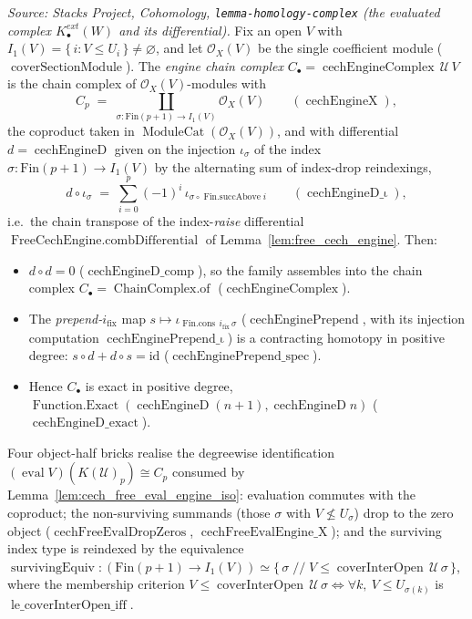 \begin{lemma}
  \textit{Source: Stacks Project, Cohomology, \texttt{lemma-homology-complex}
  (the evaluated complex \(K^{ext}_\bullet(W)\) and its differential).}
  Fix an open \(V\) with \(I_1(V) = \{\, i : V \leq U_i \,\} \neq \varnothing\), and
  let \(\mathcal{O}_X(V)\) be the single coefficient module
  (\(\operatorname{coverSectionModule}\)). The \emph{engine chain complex}
  \(C_\bullet = \operatorname{cechEngineComplex}\, \mathcal{U}\, V\) is the chain
  complex of \(\mathcal{O}_X(V)\)-modules with
  \[
    C_p \;=\; \coprod_{\sigma : \mathrm{Fin}(p+1) \to I_1(V)} \mathcal{O}_X(V)
    \qquad (\operatorname{cechEngineX}),
  \]
  the coproduct taken in \(\operatorname{ModuleCat}(\mathcal{O}_X(V))\), and with
  differential \(d = \operatorname{cechEngineD}\) given on the injection
  \(\iota_\sigma\) of the index \(\sigma : \mathrm{Fin}(p+1) \to I_1(V)\) by the
  alternating sum of index-drop reindexings,
  \[
    d \circ \iota_\sigma
      \;=\; \sum_{i=0}^{p} (-1)^i\, \iota_{\sigma \circ \operatorname{Fin.succAbove} i}
    \qquad (\operatorname{cechEngineD\_\iota}),
  \]
  i.e.\ the chain transpose of the index-\emph{raise} differential
  \(\operatorname{FreeCechEngine.combDifferential}\) of
  Lemma~\ref{lem:free_cech_engine}. Then:
  \begin{itemize}
    \item \(d \circ d = 0\) (\(\operatorname{cechEngineD\_comp}\)), so the family
      assembles into the chain complex \(C_\bullet = \operatorname{ChainComplex.of}\)
      (\(\operatorname{cechEngineComplex}\)).
    \item The \emph{prepend-\(i_{\mathrm{fix}}\)} map
      \(s \mapsto \iota_{\operatorname{Fin.cons}\, i_{\mathrm{fix}}\, \sigma}\)
      (\(\operatorname{cechEnginePrepend}\), with its injection computation
      \(\operatorname{cechEnginePrepend\_\iota}\)) is a contracting homotopy in
      positive degree: \(s \circ d + d \circ s = \mathrm{id}\)
      (\(\operatorname{cechEnginePrepend\_spec}\)).
    \item Hence \(C_\bullet\) is exact in positive degree,
      \(\operatorname{Function.Exact}(\operatorname{cechEngineD}(n+1),
      \operatorname{cechEngineD} n)\) (\(\operatorname{cechEngineD\_exact}\)).
  \end{itemize}
  Four object-half bricks realise the degreewise identification
  \((\operatorname{eval} V)(K(\mathcal{U})_p) \cong C_p\) consumed by
  Lemma~\ref{lem:cech_free_eval_engine_iso}: evaluation commutes with the coproduct;
  the non-surviving summands (those \(\sigma\) with \(V \not\leq U_\sigma\)) drop to the
  zero object (\(\operatorname{cechFreeEvalDropZeros}\),
  \(\operatorname{cechFreeEvalEngine\_X}\)); and the surviving index type is reindexed
  by the equivalence
  \(\operatorname{survivingEquiv} : (\mathrm{Fin}(p+1) \to I_1(V)) \simeq
  \{\, \sigma \;//\; V \leq \operatorname{coverInterOpen}\, \mathcal{U}\, \sigma \,\}\),
  where the membership criterion
  \(V \leq \operatorname{coverInterOpen}\, \mathcal{U}\, \sigma
  \iff \forall k,\ V \leq U_{\sigma(k)}\) is
  \(\operatorname{le\_coverInterOpen\_iff}\).


\end{lemma}
